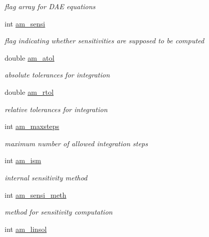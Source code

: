 \begin{DoxyCompactItemize}
\begin{DoxyCompactList}\small\item\em flag array for D\+A\+E equations \end{DoxyCompactList}\item 
\hypertarget{struct_user_data_a3bd631d595b8a864de83f25a1756ce3d}{}int \hyperlink{struct_user_data_a3bd631d595b8a864de83f25a1756ce3d}{am\+\_\+sensi}\label{struct_user_data_a3bd631d595b8a864de83f25a1756ce3d}

\begin{DoxyCompactList}\small\item\em flag indicating whether sensitivities are supposed to be computed \end{DoxyCompactList}\item 
\hypertarget{struct_user_data_a2aade90998d7e2cefa7953d4fdbc438b}{}double \hyperlink{struct_user_data_a2aade90998d7e2cefa7953d4fdbc438b}{am\+\_\+atol}\label{struct_user_data_a2aade90998d7e2cefa7953d4fdbc438b}

\begin{DoxyCompactList}\small\item\em absolute tolerances for integration \end{DoxyCompactList}\item 
\hypertarget{struct_user_data_a2370b78f280747d84a69619ea8c55985}{}double \hyperlink{struct_user_data_a2370b78f280747d84a69619ea8c55985}{am\+\_\+rtol}\label{struct_user_data_a2370b78f280747d84a69619ea8c55985}

\begin{DoxyCompactList}\small\item\em relative tolerances for integration \end{DoxyCompactList}\item 
\hypertarget{struct_user_data_a0187950731c16f2857d0cd5b92416352}{}int \hyperlink{struct_user_data_a0187950731c16f2857d0cd5b92416352}{am\+\_\+maxsteps}\label{struct_user_data_a0187950731c16f2857d0cd5b92416352}

\begin{DoxyCompactList}\small\item\em maximum number of allowed integration steps \end{DoxyCompactList}\item 
int \hyperlink{struct_user_data_a1f2514c0ee00da61ade386173b718a02}{am\+\_\+ism}
\begin{DoxyCompactList}\small\item\em internal sensitivity method \end{DoxyCompactList}\item 
int \hyperlink{struct_user_data_a83bc6716ecf3decb3d963929361fcd6d}{am\+\_\+sensi\+\_\+meth}
\begin{DoxyCompactList}\small\item\em method for sensitivity computation \end{DoxyCompactList}\item 
\hypertarget{struct_user_data_a03fa52449ab4bb9a1a75312fd9064db1}{}int \hyperlink{struct_user_data_a03fa52449ab4bb9a1a75312fd9064db1}{am\+\_\+linsol}\label{struct_user_data_a03fa52449ab4bb9a1a75312fd9064db1}


\end{DoxyCompactItemize}
